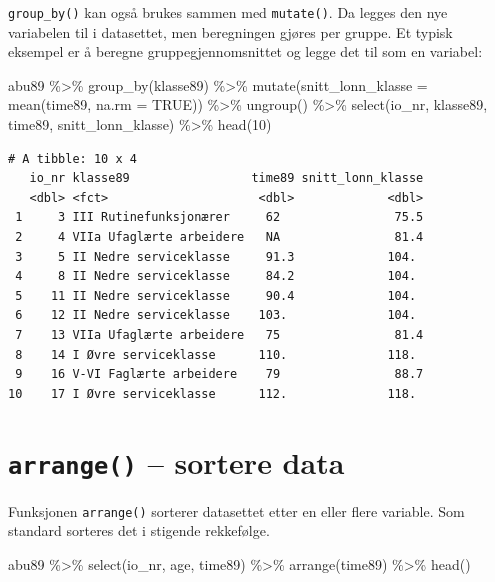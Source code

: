 \documentclass[
  norsk,
  letterpaper,
  DIV=11,
  numbers=noendperiod]{scrreprt}
\newenvironment{Shaded}{\begin{snugshade}}{\end{snugshade}}
\newcommand{\AttributeTok}[1]{\textcolor[rgb]{0.40,0.45,0.13}{#1}}
\newcommand{\ConstantTok}[1]{\textcolor[rgb]{0.56,0.35,0.01}{#1}}
\newcommand{\DecValTok}[1]{\textcolor[rgb]{0.68,0.00,0.00}{#1}}
\newcommand{\FunctionTok}[1]{\textcolor[rgb]{0.28,0.35,0.67}{#1}}
\newcommand{\NormalTok}[1]{\textcolor[rgb]{0.00,0.23,0.31}{#1}}
\newcommand{\SpecialCharTok}[1]{\textcolor[rgb]{0.37,0.37,0.37}{#1}}
\theoremstyle{definition}
\theoremstyle{remark}
\begin{document}
\texttt{group\_by()} kan også brukes sammen med \texttt{mutate()}. Da
legges den nye variabelen til i datasettet, men beregningen gjøres per
gruppe. Et typisk eksempel er å beregne gruppegjennomsnittet og legge
det til som en variabel:

\begin{Shaded}
\begin{Highlighting}[]
\NormalTok{abu89 }\SpecialCharTok{\%\textgreater{}\%}
  \FunctionTok{group\_by}\NormalTok{(klasse89) }\SpecialCharTok{\%\textgreater{}\%}
  \FunctionTok{mutate}\NormalTok{(}\AttributeTok{snitt\_lonn\_klasse =} \FunctionTok{mean}\NormalTok{(time89, }\AttributeTok{na.rm =} \ConstantTok{TRUE}\NormalTok{)) }\SpecialCharTok{\%\textgreater{}\%}
  \FunctionTok{ungroup}\NormalTok{() }\SpecialCharTok{\%\textgreater{}\%}
  \FunctionTok{select}\NormalTok{(io\_nr, klasse89, time89, snitt\_lonn\_klasse) }\SpecialCharTok{\%\textgreater{}\%}
  \FunctionTok{head}\NormalTok{(}\DecValTok{10}\NormalTok{)}
\end{Highlighting}
\end{Shaded}

\begin{verbatim}
# A tibble: 10 x 4
   io_nr klasse89                 time89 snitt_lonn_klasse
   <dbl> <fct>                     <dbl>             <dbl>
 1     3 III Rutinefunksjonærer     62                75.5
 2     4 VIIa Ufaglærte arbeidere   NA                81.4
 3     5 II Nedre serviceklasse     91.3             104. 
 4     8 II Nedre serviceklasse     84.2             104. 
 5    11 II Nedre serviceklasse     90.4             104. 
 6    12 II Nedre serviceklasse    103.              104. 
 7    13 VIIa Ufaglærte arbeidere   75                81.4
 8    14 I Øvre serviceklasse      110.              118. 
 9    16 V-VI Faglærte arbeidere    79                88.7
10    17 I Øvre serviceklasse      112.              118. 
\end{verbatim}

\section{\texorpdfstring{\texttt{arrange()} -- sortere
data}{arrange() -- sortere data}}\label{arrange-sortere-data}

Funksjonen \texttt{arrange()} sorterer datasettet etter en eller flere
variable. Som standard sorteres det i stigende rekkefølge.

\begin{Shaded}
\begin{Highlighting}[]
\NormalTok{abu89 }\SpecialCharTok{\%\textgreater{}\%}
  \FunctionTok{select}\NormalTok{(io\_nr, age, time89) }\SpecialCharTok{\%\textgreater{}\%}
  \FunctionTok{arrange}\NormalTok{(time89) }\SpecialCharTok{\%\textgreater{}\%}
  \FunctionTok{head}\NormalTok{()}
\end{Highlighting}
\end{Shaded}
\end{document}
